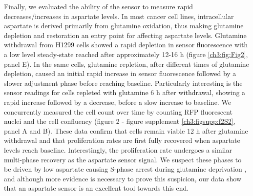 Finally, we evaluated the ability of the sensor to measure rapid decreases/increases in aspartate levels.
In most cancer cell lines, intracellular aspartate is derived primarily from glutamine oxidation, thus making glutamine depletion and restoration an entry point for affecting aspartate levels.
Glutamine withdrawal from H1299 cells showed a rapid depletion in sensor fluorescence with a low level steady-state reached after approximately 12-16 h (figure \ref{ch3:fig:Fig2}, panel E).
In the same cells, glutamine repletion, after different times of glutamine depletion, caused an initial rapid increase in sensor fluorescence followed by a slower adjustment phase before reaching baseline.
Particularly interesting is the sensor readings for cells repleted with glutamine 6 h after withdrawal, showing a rapid increase followed by a decrease, before a slow increase to baseline.
We concurrently measured the cell count over time by counting RFP fluorescent nuclei and the cell confluency (figure 2 - figure supplement \ref{ch3:figsupp:f2S2}, panel A and B).
These data confirm that cells remain viable 12 h after glutamine withdrawal and that proliferation rates are first fully recovered when aspartate levels reach baseline.
Interestingly, the proliferation rate undergoes a similar multi-phase recovery as the aspartate sensor signal.
We suspect these phases to be driven by low aspartate causing S-phase arrest during glutamine deprivation \cite{Patel2016-ms}, and although more evidence is necessary to prove this suspicion, our data show that an aspartate sensor is an excellent tool towards this end.




